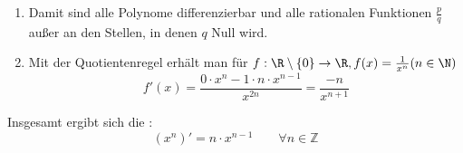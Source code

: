 \begin{enumerate}
    \item Damit sind alle Polynome differenzierbar und alle rationalen Funktionen $\frac{p}{q}$ außer an den Stellen, in denen $q$ Null wird.
    \item Mit der Quotientenregel erhält man für $f: \R \setminus \{0\} \to \R, f(x) = \frac{1}{x^n} (n \in \N)$
    $$f'(x) = \frac{0 \cdot x^n - 1 \cdot n \cdot x^{n-1}}{x^{2n}} = \frac{-n}{x^{n+1}}$$
\end{enumerate}
Insgesamt ergibt sich die :
$$(x^n)' = n \cdot x^{n-1} \qquad \forall n \in \mathbb{Z}$$
